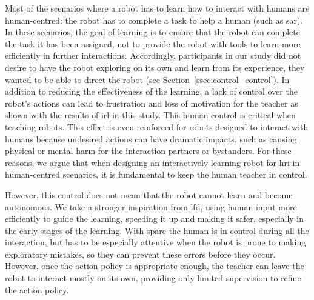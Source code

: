Most of the scenarios where a robot has to learn how to interact with humans are human-centred: the robot has to complete a task to help a human (such as \gls{sar}). In these scenarios, the goal of learning is to ensure that the robot can complete the task it has been assigned, not to provide the robot with tools to learn more efficiently in further interactions. Accordingly, participants in our study did not desire to have the robot exploring on its own and learn from its experience, they wanted to be able to direct the robot (see Section~\ref{ssec:control_control}). In addition to reducing the effectiveness of the learning, a lack of control over the robot's actions can lead to frustration and loss of motivation for the teacher as shown with the results of \gls{irl} in this study. This human control is critical when teaching robots. This effect is even reinforced for robots designed to interact with humans because undesired actions can have dramatic impacts, such as causing physical or mental harm for the interaction partners or bystanders. For these reasons, we argue that when designing an interactively learning robot for \gls{hri} in human-centred scenarios, it is fundamental to keep the human teacher in control. 

However, this control does not mean that the robot cannot learn and become autonomous. We take a stronger inspiration from \gls{lfd}, using human input more efficiently to guide the learning, speeding it up and making it safer, especially in the early stages of the learning. With \gls{sparc} the human is in control during all  the interaction, but has to be especially attentive when the robot is prone to making exploratory mistakes, so they can prevent these errors before they occur. However, once the action policy is appropriate enough, the teacher can leave the robot to interact mostly on its own, providing only limited supervision to refine the action policy.


